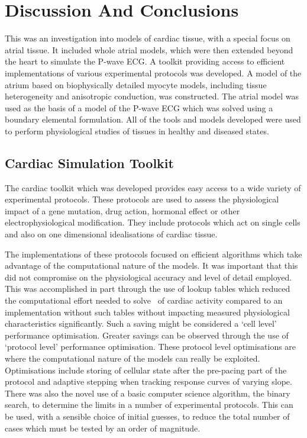 \chapter{Discussion And Conclusions}


This was an investigation into models of cardiac tissue, with a special focus on
atrial tissue.
It included whole atrial models, which were then extended beyond the heart to
simulate the P-wave ECG.
A toolkit providing access to efficient implementations of various experimental
protocols was developed.
A model of the atrium based on biophysically detailed myocyte models, including tissue heterogeneity and anisotropic
conduction, was constructed.
The atrial model was used as the basis of a model of the P-wave ECG which was
solved using a boundary elemental formulation.
All of the tools and models developed were used to perform physiological
studies of tissues in healthy and diseased states.

\section{Cardiac Simulation Toolkit}

The cardiac toolkit which was developed provides easy access to a wide variety
of experimental protocols.
These protocols are used to assess the physiological impact of a gene mutation,
drug action, hormonal effect or other electrophysiological modification.
They include protocols which act on single cells and also on one dimensional
idealisations of cardiac tissue.

The implementations of these protocols focused on efficient algorithms
which take advantage of the computational nature of the models.
It was important that this did not compromise on the physiological accuracy and
level of detail employed.
This was accomplished in part through the use of lookup tables which reduced the
computational effort needed to solve \ of cardiac activity compared to an
implementation without such tables without impacting measured physiological
characteristics significantly.
Such a saving might be considered a `cell level' performance optimisation.
Greater savings can be observed through the use of `protocol level' performance
optimisation.
These protocol level optimisations are where the computational nature of the
models can really be exploited.
Optimisations include storing of cellular state after the pre-pacing part of the
protocol and adaptive stepping when tracking response curves of varying slope.
There was also the novel use of a basic computer science algorithm, the binary
search, to determine the limits in a number of experimental protocols.
This can be used, with a sensible choice of initial guesses, to reduce the total
number of cases which must be tested by an order of magnitude.

